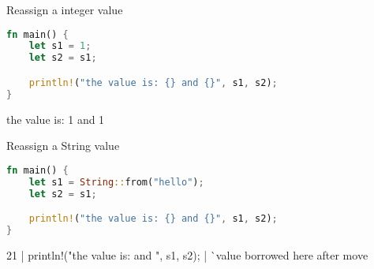 \begin{frame}[fragile,t]{Reassign a integer value}
    \begin{lstlisting}[language=Rust,escapechar=@,label={lst:borrowing1}]
fn main() {
    let s1 = 1;
    let s2 = s1;

    println!("the value is: {} and {}", s1, s2);
}\end{lstlisting}
    \pause
    \begin{codeoutput}
the value is: 1 and 1
\end{codeoutput}
\end{frame}

\begin{frame}[fragile]{Reassign a String value}
    \begin{lstlisting}[language=Rust,escapechar=@,label={lst:borrowing2}]
fn main() {
    let s1 = String::from("hello");
    let s2 = s1;

    println!("the value is: {} and {}", s1, s2);
}\end{lstlisting}
    \pause
    \begin{codeoutput}[red]
21 |     println!("the value is: {} and {}", s1, s2);
   |                                         ^^ value
borrowed here after move\end{codeoutput}
\end{frame}
